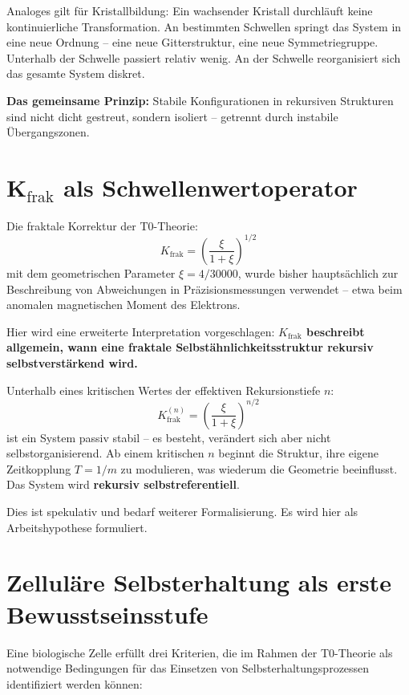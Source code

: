 	Analoges gilt für Kristallbildung: Ein wachsender Kristall durchläuft keine kontinuierliche Transformation. An bestimmten Schwellen springt das System in eine neue Ordnung -- eine neue Gitterstruktur, eine neue Symmetriegruppe. Unterhalb der Schwelle passiert relativ wenig. An der Schwelle reorganisiert sich das gesamte System diskret.
	
	\textbf{Das gemeinsame Prinzip:} Stabile Konfigurationen in rekursiven Strukturen sind nicht dicht gestreut, sondern isoliert -- getrennt durch instabile Übergangszonen.
	
	\section{K$_{\text{frak}}$ als Schwellenwertoperator}
	
	Die fraktale Korrektur der T0-Theorie:
	\begin{equation}
		K_{\text{frak}} = \left(\frac{\xi}{1+\xi}\right)^{1/2}
	\end{equation}
	mit dem geometrischen Parameter $\xi = 4/30000$, wurde bisher hauptsächlich zur Beschreibung von Abweichungen in Präzisionsmessungen verwendet -- etwa beim anomalen magnetischen Moment des Elektrons.
	
	Hier wird eine erweiterte Interpretation vorgeschlagen: \textbf{$K_{\text{frak}}$ beschreibt allgemein, wann eine fraktale Selbstähnlichkeitsstruktur rekursiv selbstverstärkend wird.}
	
	Unterhalb eines kritischen Wertes der effektiven Rekursionstiefe $n$:
	\begin{equation}
		K_{\text{frak}}^{(n)} = \left(\frac{\xi}{1+\xi}\right)^{n/2}
	\end{equation}
	ist ein System passiv stabil -- es besteht, verändert sich aber nicht selbstorganisierend. Ab einem kritischen $n$ beginnt die Struktur, ihre eigene Zeitkopplung $T = 1/m$ zu modulieren, was wiederum die Geometrie beeinflusst. Das System wird \textbf{rekursiv selbstreferentiell}.
	
	Dies ist spekulativ und bedarf weiterer Formalisierung. Es wird hier als Arbeitshypothese formuliert.
	
	\section{Zelluläre Selbsterhaltung als erste Bewusstseinsstufe}
	
	Eine biologische Zelle erfüllt drei Kriterien, die im Rahmen der T0-Theorie als notwendige Bedingungen für das Einsetzen von Selbsterhaltungsprozessen identifiziert werden können:
	
